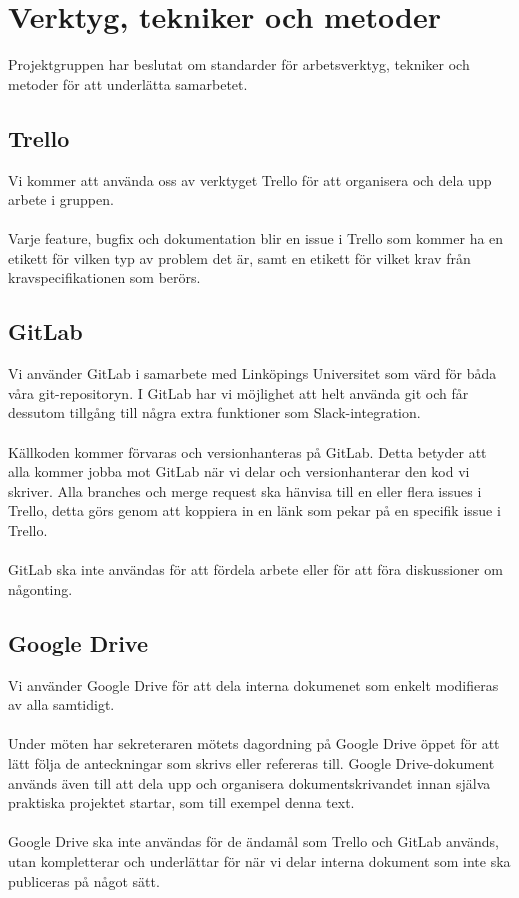 \section{Verktyg, tekniker och metoder}
Projektgruppen har beslutat om standarder för arbetsverktyg, tekniker och metoder för att underlätta samarbetet. 

\subsection{Trello}
Vi kommer att använda oss av verktyget Trello\cite{website:trello} för att organisera och dela upp arbete i gruppen. 
\\ \\
Varje feature, bugfix och dokumentation blir en issue i Trello som kommer ha en etikett för vilken typ av problem det är, samt en etikett för vilket krav från kravspecifikationen som berörs.

\subsection{GitLab}
Vi använder GitLab\cite{website:gitlab} i samarbete med Linköpings Universitet som värd för båda våra git-repositoryn. I GitLab har vi möjlighet att helt använda git och får dessutom tillgång till några extra funktioner som Slack-integration. 
\\ \\
Källkoden kommer förvaras och versionhanteras på GitLab. Detta betyder att alla kommer jobba mot GitLab när vi delar och versionhanterar den kod vi skriver. Alla branches och merge request ska hänvisa till en eller flera issues i Trello, detta görs genom att koppiera in en länk som pekar på en specifik issue i Trello.
\\ \\
GitLab ska inte användas för att fördela arbete eller för att föra diskussioner om någonting.

\subsection{Google Drive}
Vi använder Google Drive\cite{website:googledrive} för att dela interna dokumenet som enkelt modifieras av alla samtidigt. 
\\ \\
Under möten har sekreteraren mötets dagordning på Google Drive öppet för att lätt följa de anteckningar som skrivs eller refereras till. Google Drive-dokument används även till att dela upp och organisera dokumentskrivandet innan själva praktiska projektet startar, som till exempel denna text.
\\ \\
Google Drive ska inte användas för de ändamål som Trello och GitLab används, utan kompletterar och underlättar för när vi delar interna dokument som inte ska publiceras på något sätt.

